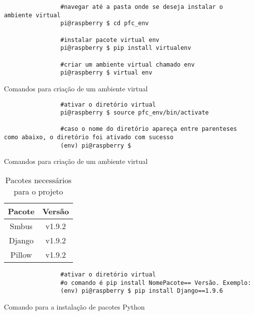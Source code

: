 			\begin{listing}
				\begin{verbatim}
				#navegar até a pasta onde se deseja instalar o ambiente virtual
				pi@raspberry $ cd pfc_env
				
				#instalar pacote virtual env
				pi@raspberry $ pip install virtualenv
				
				#criar um ambiente virtual chamado env
				pi@raspberry $ virtual env			
				\end{verbatim}
				\caption{Comandos para criação de um ambiente virtual}
			\label{cod:venv}
			\end{listing}
		
			\begin{listing}
				\begin{verbatim}
				#ativar o diretório virtual
				pi@raspberry $ source pfc_env/bin/activate
				
				#caso o nome do diretório apareça entre parenteses como abaixo, o diretório foi ativado com sucesso
				(env) pi@raspberry $ 		
				\end{verbatim}
				\caption{Comandos para criação de um ambiente virtual}
				\label{cod:activate_venv}
			\end{listing}

			
			\begin{table}[!htb]
				\centering
				\caption{Pacotes necessários para o projeto}
				\label{tbl6}
				\def\arraystretch{1.3}
				\begin{tabular}{c c}
					\hline
					\multicolumn{1}{c}{\textbf{Pacote}} & \multicolumn{1}{c}{\textbf{Versão}} \\ \hline
					
					Smbus & v1.9.2 \\
					Django & v1.9.2 \\ %
					Pillow & v1.9.2 \\ %
					\hline
				\end{tabular}
			\end{table}
		
			\begin{listing}
				\begin{verbatim}
				#ativar o diretório virtual
				#o comando é pip install NomePacote== Versão. Exemplo:
				(env) pi@raspberry $ pip install Django==1.9.6					
				\end{verbatim}
				\caption{Comando para a instalação de pacotes Python}
				\label{cod:install}
			\end{listing}
		
